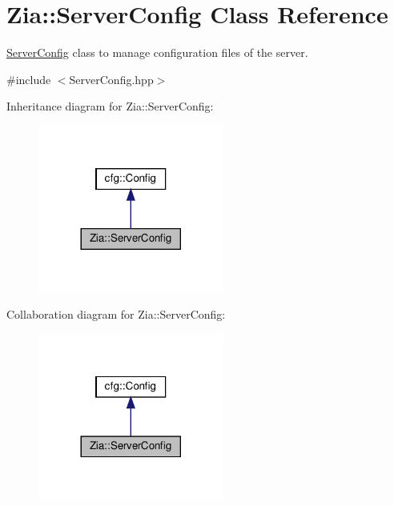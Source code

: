 \hypertarget{class_zia_1_1_server_config}{}\section{Zia\+:\+:Server\+Config Class Reference}
\label{class_zia_1_1_server_config}


\hyperlink{class_zia_1_1_server_config}{Server\+Config} class to manage configuration files of the server.  




{\ttfamily \#include $<$Server\+Config.\+hpp$>$}



Inheritance diagram for Zia\+:\+:Server\+Config\+:\nopagebreak
\begin{figure}[H]
\begin{center}
\leavevmode
\includegraphics[width=173pt]{class_zia_1_1_server_config__inherit__graph}
\end{center}
\end{figure}


Collaboration diagram for Zia\+:\+:Server\+Config\+:\nopagebreak
\begin{figure}[H]
\begin{center}
\leavevmode
\includegraphics[width=173pt]{class_zia_1_1_server_config__coll__graph}
\end{center}
\end{figure}
